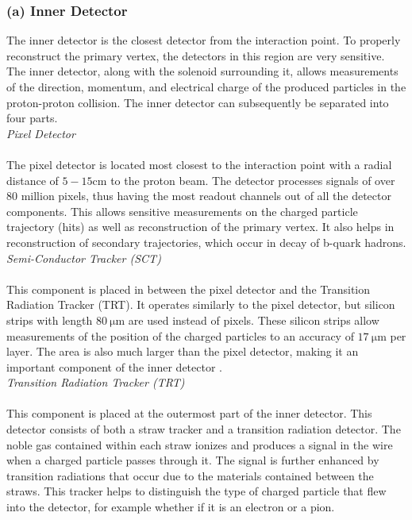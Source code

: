 \documentclass[a4paper]{report}
\numberwithin{equation}{section}
\begin{document}
\subsubsection{(a) Inner Detector}

The inner detector is the closest detector from the interaction point. To properly reconstruct the primary vertex, the detectors in this region are very 
sensitive. The inner detector, along with the solenoid surrounding it, allows measurements of the direction, momentum, and electrical charge of the 
produced particles in the proton-proton collision. The inner detector can subsequently be separated into four parts. \\ 

\noindent \textit{Pixel Detector} \\ \\
The pixel detector is located most closest to the interaction point with a radial distance of $5 - 15$cm to the proton beam. The detector processes signals of 
over 80 million pixels, thus having the most readout channels out of all the detector components. This allows sensitive measurements on the charged particle 
trajectory (hits) as well as reconstruction of the primary vertex. It also helps in reconstruction of secondary trajectories, which occur in decay of b-quark 
hadrons. \\ 

\noindent \textit{Semi-Conductor Tracker (SCT)} \\ \\ 
This component is placed in between the pixel detector and the Transition Radiation Tracker (TRT). It operates similarly to the pixel detector, but 
silicon strips with length $\SI{80}{\micro\metre}$ are used instead of pixels. These silicon strips allow measurements of the position of the 
charged particles to an accuracy of $\SI{17}{\micro\metre}$ per layer. The area is also much larger than the pixel detector, making it an important component 
of the inner detector \cite{ATLASFactSheet}. \\ 

\noindent \textit{Transition Radiation Tracker (TRT)} \\ \\ 
This component is placed at the outermost part of the inner detector. This detector consists of both a straw tracker and a transition radiation detector. 
The noble gas contained within each straw ionizes and produces a signal in the wire when a charged particle passes through it. The signal is further enhanced 
by transition radiations that occur due to the materials contained between the straws. This tracker helps to distinguish the type of charged particle that
flew into the detector, for example whether if it is an electron or a pion. \\ 
\end{document}
